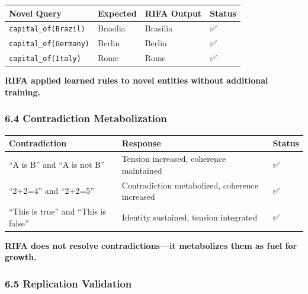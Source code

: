 \documentclass[
  11pt,
  a4paper,
]{article}
\begin{document}
\begin{longtable}[]{@{}llll@{}}
\toprule\noalign{}
Novel Query & Expected & RIFA Output & Status \\
\midrule\noalign{}
\endhead
\bottomrule\noalign{}
\endlastfoot
\texttt{capital\_of(Brazil)} & Brasilia & Brasilia & ✅ \\
\texttt{capital\_of(Germany)} & Berlin & Berlin & ✅ \\
\texttt{capital\_of(Italy)} & Rome & Rome & ✅ \\
\end{longtable}

\textbf{RIFA applied learned rules to novel entities without additional
training.}

\subsubsection{6.4 Contradiction
Metabolization}\label{contradiction-metabolization-1}

\begin{longtable}[]{@{}
  >{\raggedright\arraybackslash}p{}
  >{\raggedright\arraybackslash}p{}
  >{\raggedright\arraybackslash}p{}@{}}
\toprule\noalign{}
\begin{minipage}[b]{\linewidth}\raggedright
Contradiction
\end{minipage} & \begin{minipage}[b]{\linewidth}\raggedright
Response
\end{minipage} & \begin{minipage}[b]{\linewidth}\raggedright
Status
\end{minipage} \\
\midrule\noalign{}
\endhead
\bottomrule\noalign{}
\endlastfoot
``A is B'' and ``A is not B'' & Tension increased, coherence maintained
& ✅ \\
``2+2=4'' and ``2+2=5'' & Contradiction metabolized, coherence increased
& ✅ \\
``This is true'' and ``This is false'' & Identity sustained, tension
integrated & ✅ \\
\end{longtable}

\textbf{RIFA does not resolve contradictions---it metabolizes them as
fuel for growth.}

\subsubsection{6.5 Replication Validation}\label{replication-validation}
\end{document}
